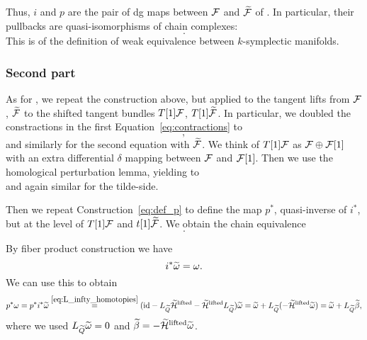 Thus, $i$ and $p$ are the pair of dg maps between $\mathcal{F}$ and $\widetilde{\mathcal{F}}$ of .
In particular, their pullbacks are quasi-isomorphisms of chain complexes:
\begin{equation}
     .
\end{equation}
This is  of the definition of weak equivalence between $k$-symplectic manifolds.

\subsubsection{Second part}
\label{subsubsec:second_part}

As for , we repeat the construction above, but applied to the tangent lifts from $\mathcal{F}$, $\widetilde{\mathcal{F}}$ to the shifted tangent bundles $T[1]\mathcal{F}$, $T[1]\widetilde{\mathcal{F}}$.
In particular, we doubled the constractions in the first Equation~\ref{eq:contractions} to
\begin{equation}
    ,
\end{equation}
and similarly for the second equation with $\widetilde{\mathcal{F}}$.
We think of $T[1]\mathcal{F}$ as $\mathcal{F} \oplus \mathcal{F}[1]$ with an extra differential $\delta$ mapping between $\mathcal{F}$ and $\mathcal{F}[1]$.
Then we use the homological perturbation lemma, yielding to
\begin{equation}
    
\end{equation}
and again similar for the tilde-side.

Then we repeat Construction~\ref{eq:def_p} to define the map $p^*$, quasi-inverse of $i^*$, but at the level of $T[1]\mathcal{F}$ and $t[1]\widetilde{\mathcal{F}}$.
We obtain the chain equivalence
\begin{equation}
\label{eq:maps_sketch_proof_part_b}
     .
\end{equation}

By fiber product construction we have 
\begin{equation*}
    i^* \widetilde{\omega} = \omega .
\end{equation*}
We can use this to obtain
\begin{equation*}
    p^* \omega =
    p^* i^* \widetilde{\omega}
    \stackrel{\ref{eq:L_infty_homotopies}}{=}
    (\text{id} - L_{\widetilde{Q}} \widetilde{\mathcal{H}}^\text{lifted} - \widetilde{\mathcal{H}}^\text{lifted} L_{\widetilde{Q}}) \widetilde{\omega} =
    \widetilde{\omega} + L_{\widetilde{Q}} (- \widetilde{\mathcal{H}}^\text{lifted} \widetilde{\omega}) =
    \widetilde{\omega} + L_{\widetilde{Q}} \widetilde{\beta},
\end{equation*}
where we used $L_{\widetilde{Q}} \widetilde{\omega}=0$ and $\widetilde{\beta}=- \widetilde{\mathcal{H}}^\text{lifted} \widetilde{\omega}$.

